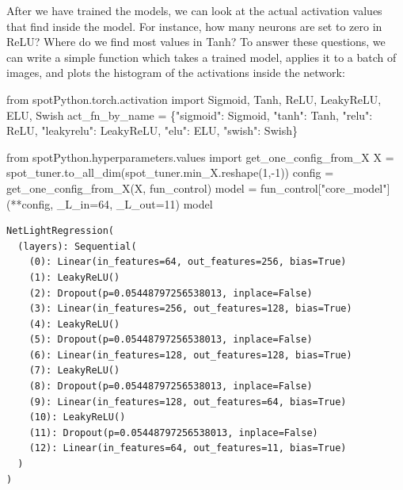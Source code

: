 \documentclass[
  letterpaper,
  DIV=11,
  numbers=noendperiod]{scrreprt}
\newenvironment{Shaded}{\begin{snugshade}}{\end{snugshade}}
\newcommand{\DecValTok}[1]{\textcolor[rgb]{0.68,0.00,0.00}{#1}}
\newcommand{\ImportTok}[1]{\textcolor[rgb]{0.00,0.46,0.62}{#1}}
\newcommand{\NormalTok}[1]{\textcolor[rgb]{0.00,0.23,0.31}{#1}}
\newcommand{\OperatorTok}[1]{\textcolor[rgb]{0.37,0.37,0.37}{#1}}
\newcommand{\StringTok}[1]{\textcolor[rgb]{0.13,0.47,0.30}{#1}}
\begin{document}
After we have trained the models, we can look at the actual activation
values that find inside the model. For instance, how many neurons are
set to zero in ReLU? Where do we find most values in Tanh? To answer
these questions, we can write a simple function which takes a trained
model, applies it to a batch of images, and plots the histogram of the
activations inside the network:

\begin{Shaded}
\begin{Highlighting}[]
\ImportTok{from}\NormalTok{ spotPython.torch.activation }\ImportTok{import}\NormalTok{ Sigmoid, Tanh, ReLU, LeakyReLU, ELU, Swish}
\NormalTok{act\_fn\_by\_name }\OperatorTok{=}\NormalTok{ \{}\StringTok{"sigmoid"}\NormalTok{: Sigmoid, }\StringTok{"tanh"}\NormalTok{: Tanh, }\StringTok{"relu"}\NormalTok{: ReLU, }\StringTok{"leakyrelu"}\NormalTok{: LeakyReLU, }\StringTok{"elu"}\NormalTok{: ELU, }\StringTok{"swish"}\NormalTok{: Swish\}}
\end{Highlighting}
\end{Shaded}

\begin{Shaded}
\begin{Highlighting}[]
\ImportTok{from}\NormalTok{ spotPython.hyperparameters.values }\ImportTok{import}\NormalTok{ get\_one\_config\_from\_X}
\NormalTok{X }\OperatorTok{=}\NormalTok{ spot\_tuner.to\_all\_dim(spot\_tuner.min\_X.reshape(}\DecValTok{1}\NormalTok{,}\OperatorTok{{-}}\DecValTok{1}\NormalTok{))}
\NormalTok{config }\OperatorTok{=}\NormalTok{ get\_one\_config\_from\_X(X, fun\_control)}
\NormalTok{model }\OperatorTok{=}\NormalTok{ fun\_control[}\StringTok{"core\_model"}\NormalTok{](}\OperatorTok{**}\NormalTok{config, \_L\_in}\OperatorTok{=}\DecValTok{64}\NormalTok{, \_L\_out}\OperatorTok{=}\DecValTok{11}\NormalTok{)}
\NormalTok{model}
\end{Highlighting}
\end{Shaded}

\begin{verbatim}
NetLightRegression(
  (layers): Sequential(
    (0): Linear(in_features=64, out_features=256, bias=True)
    (1): LeakyReLU()
    (2): Dropout(p=0.05448797256538013, inplace=False)
    (3): Linear(in_features=256, out_features=128, bias=True)
    (4): LeakyReLU()
    (5): Dropout(p=0.05448797256538013, inplace=False)
    (6): Linear(in_features=128, out_features=128, bias=True)
    (7): LeakyReLU()
    (8): Dropout(p=0.05448797256538013, inplace=False)
    (9): Linear(in_features=128, out_features=64, bias=True)
    (10): LeakyReLU()
    (11): Dropout(p=0.05448797256538013, inplace=False)
    (12): Linear(in_features=64, out_features=11, bias=True)
  )
)
\end{verbatim}
\end{document}
